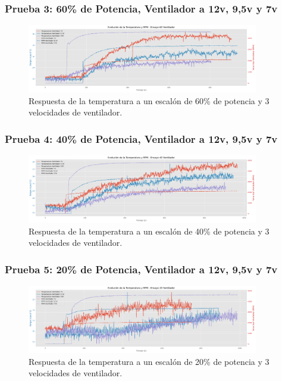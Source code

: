 \documentclass[spanish, a4paper, 11pt]{article}
\begin{document}
\subsubsection{Prueba 3: 60\% de Potencia, Ventilador a 12v, 9,5v y 7v}

\begin{figure}[ht]
    \centering
    \includegraphics[width=0.9\textwidth]{./figures/ventilador_60.png}
    \caption{Respuesta de la temperatura a un escalón de 60\% de potencia y 3 velocidades de ventilador.}
\end{figure}
\FloatBarrier
\pagebreak

\subsubsection{Prueba 4: 40\% de Potencia, Ventilador a 12v, 9,5v y 7v}

\begin{figure}[ht]
    \centering
    \includegraphics[width=0.9\textwidth]{./figures/ventilador_40.png}
    \caption{Respuesta de la temperatura a un escalón de 40\% de potencia y 3 velocidades de ventilador.}
\end{figure}
\FloatBarrier

\subsubsection{Prueba 5: 20\% de Potencia, Ventilador a 12v, 9,5v y 7v}

\begin{figure}[ht]
    \centering
    \includegraphics[width=0.9\textwidth]{./figures/ventilador_20.png}
    \caption{Respuesta de la temperatura a un escalón de 20\% de potencia y 3 velocidades de ventilador.}
\end{figure}
\FloatBarrier
\end{document}
